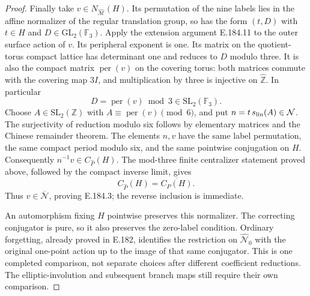 \begin{proof}
Finally take \(v\in N_{\widehat{\mathcal M}}(H)\).
Its permutation of the nine labels lies in the affine
normalizer of the regular translation group, so has
the form \((t,D)\) with
\(t\in H\) and \(D\in\mathrm{GL}_2(\mathbb F_3)\).
Apply the extension argument E.184.11 to the outer
surface action of \(v\).  Its peripheral exponent is
one.  Its matrix on the quotient-torus compact lattice
has determinant one and reduces to \(D\) modulo three.
It is also the compact matrix \(\operatorname{per}(v)\)
on the covering torus: both matrices commute with the
covering map \(3I\), and multiplication by three is
injective on \(\widehat{\mathbb Z}\).
In particular
\[
                   D=\operatorname{per}(v)\bmod3
                             \in\mathrm{SL}_2(\mathbb F_3).
\tag{E.184.13}
\]
Choose \(A\in\mathrm{SL}_2(\mathbb Z)\) with
\(A\equiv\operatorname{per}(v)\pmod6\), and put
\(n=t\,s_{\rm lin}(A)\in\mathcal N\).
The surjectivity of reduction modulo six follows by
elementary matrices and the Chinese remainder theorem.
The elements \(n,v\) have the same label permutation,
the same compact period modulo six, and the same
pointwise conjugation on \(H\).
Consequently \(n^{-1}v\in C_{\widehat P}(H)\).
The mod-three finite centralizer statement proved
above, followed by the compact inverse limit, gives
\[
                         C_{\widehat P}(H)
                                      =\overline{C_P(H)}.
\tag{E.184.14}
\]
Thus \(v\in\overline{\mathcal N}\), proving E.184.3;
the reverse inclusion is immediate.

An automorphism fixing \(H\) pointwise preserves this
normalizer.  The correcting conjugator is pure, so it
also preserves the zero-label condition.
Ordinary forgetting, already proved in E.182, identifies
the restriction on \(\widehat{\mathcal N}_0\) with the
original one-point action up to the image of that same
conjugator.  This is one completed comparison, not
separate choices after different coefficient reductions.
The elliptic-involution and subsequent branch maps still
require their own comparison.
\end{proof}
